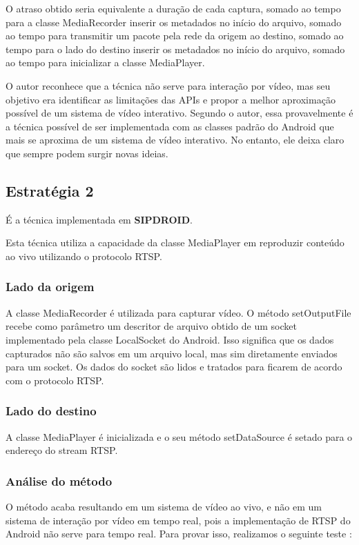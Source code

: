 \documentclass{acm_proc_article-sp}
\newcommand{\todo}[1]{\textcolor[rgb]{1.00,0.00,0.00}{\bf \uppercase{#1}}}
\begin{document}
O atraso obtido seria equivalente a duração de cada captura, somado ao tempo para a classe MediaRecorder inserir os metadados no início do arquivo, somado ao tempo para transmitir um pacote pela rede da origem ao destino, somado ao tempo para o lado do destino inserir os metadados no início do arquivo, somado ao tempo para inicializar a classe MediaPlayer.

O autor reconhece que a técnica não serve para interação por vídeo, mas seu objetivo era identificar as limitações das APIs e propor a melhor aproximação possível de um sistema de vídeo interativo. Segundo o autor, essa provavelmente é a técnica possível de ser implementada com as classes padrão do Android que mais se aproxima de um sistema de vídeo interativo. No entanto, ele deixa claro que sempre podem surgir novas ideias.

\subsection{Estratégia 2}
É a técnica implementada em \todo{sipdroid}.

Esta técnica utiliza a capacidade da classe MediaPlayer em reproduzir conteúdo ao vivo utilizando o protocolo RTSP.

\subsubsection{Lado da origem}
A classe MediaRecorder é utilizada para capturar vídeo. O método setOutputFile recebe como parâmetro um descritor de arquivo obtido de um socket implementado pela classe LocalSocket do Android. Isso significa que os dados capturados não são salvos em um arquivo local, mas sim diretamente enviados para um socket. Os dados do socket são lidos e tratados para ficarem de acordo com o protocolo RTSP.

\subsubsection{Lado do destino}
A classe MediaPlayer é inicializada e o seu método setDataSource é setado para o endereço do stream RTSP.

\subsubsection{Análise do método}
O método acaba resultando em um sistema de vídeo ao vivo, e não em um sistema de interação por vídeo em tempo real, pois a implementação de RTSP do Android não serve para tempo real. Para provar isso, realizamos o seguinte teste :
\end{document}
